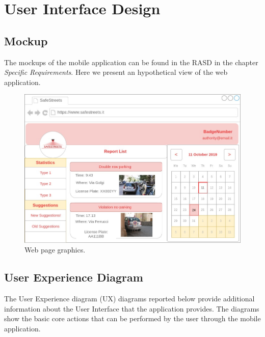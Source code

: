 \documentclass{report}
\begin{document}
\chapter{User Interface Design}
\section{Mockup}
The mockups of the mobile application can be found in the RASD in the chapter \textit{Specific Requirements}. Here we present an hypothetical view of the web application.
\begin{figure}[!ht]
	\begin{center}
	\includegraphics[width=\textwidth]{img/MockupAppWeb.png}
	\end{center}
	\caption{Web page graphics.}
\end{figure}

\section{User Experience Diagram}
The User Experience diagram (UX) diagrams reported below provide additional information about the User
Interface that the application provides. The diagrams show the basic core actions
that can be performed by the user through the mobile application. 
\end{document}
